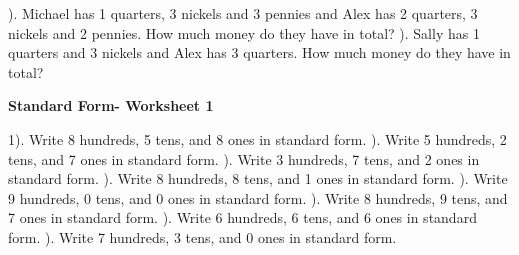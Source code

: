\documentclass{article}%
\begin{document}
\newline%
\newline%
). Michael has 1 quarters, 3 nickels and 3 pennies and Alex has 2 quarters, 3 nickels and 2 pennies. How much money do they have in total?%
\newline%
\newline%
). Sally has 1 quarters and 3 nickels and Alex has 3 quarters. How much money do they have in total?%
\newline%
\newline%
\newline%
\pagebreak%
\large%
\begin{center}%
\textbf{Standard Form- Worksheet 1}%
\newline%
\end{center} \normalsize%
1). Write 8 hundreds, 5 tens, and 8 ones in standard form.%
\newline%
\newline%
). Write 5 hundreds, 2 tens, and 7 ones in standard form.%
\newline%
\newline%
). Write 3 hundreds, 7 tens, and 2 ones in standard form.%
\newline%
\newline%
). Write 8 hundreds, 8 tens, and 1 ones in standard form.%
\newline%
\newline%
). Write 9 hundreds, 0 tens, and 0 ones in standard form.%
\newline%
\newline%
). Write 8 hundreds, 9 tens, and 7 ones in standard form.%
\newline%
\newline%
). Write 6 hundreds, 6 tens, and 6 ones in standard form.%
\newline%
\newline%
). Write 7 hundreds, 3 tens, and 0 ones in standard form.%
\newline%
\newline%
\newline%
\end{document}
